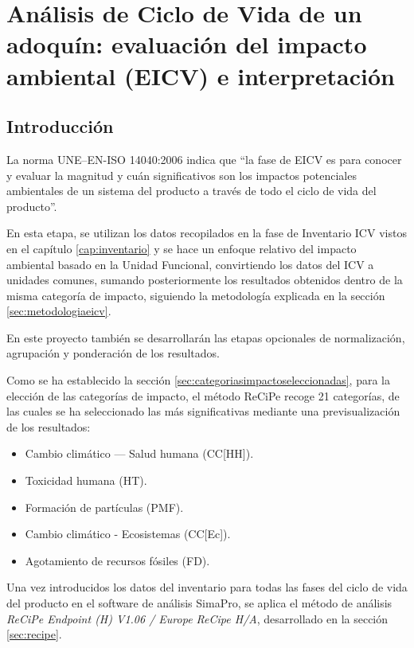 \chapter{Análisis de Ciclo de Vida de un adoquín: evaluación del impacto ambiental (EICV) e interpretación}

\section{Introducción}
La norma UNE–EN-ISO 14040:2006 \cite{iso14040} indica que ``la fase de EICV es para conocer y evaluar la magnitud y cuán significativos son los impactos potenciales ambientales de un sistema del producto a través de todo el ciclo de vida del producto''.

En esta etapa, se utilizan los datos recopilados en la fase de Inventario ICV vistos en el capítulo \ref{cap:inventario} y se hace un enfoque relativo del impacto ambiental basado en la Unidad Funcional, convirtiendo los datos del ICV a unidades comunes, sumando posteriormente los resultados obtenidos dentro de la misma categoría de impacto, siguiendo la metodología explicada en la sección \ref{sec:metodologiaeicv}.

En este proyecto también se desarrollarán las etapas opcionales de normalización, agrupación y ponderación de los resultados.

Como se ha establecido la sección \ref{sec:categoriasimpactoseleccionadas}, para la elección de las categorías de impacto, el método ReCiPe recoge 21 categorías, de las cuales se ha seleccionado las más significativas mediante una previsualización de los resultados:

\begin{itemize}
  \item Cambio climático — Salud humana (CC[HH]).
  \item Toxicidad humana (HT).
  \item Formación de partículas (PMF).
  \item Cambio climático - Ecosistemas (CC[Ec]).
  \item Agotamiento de recursos fósiles (FD).
\end{itemize}

Una vez introducidos los datos del inventario para todas las fases del ciclo de vida del producto en el software de análisis SimaPro, se aplica el método de análisis \textit{ReCiPe Endpoint (H) V1.06 / Europe ReCipe H/A}, desarrollado en la sección \ref{sec:recipe}.

